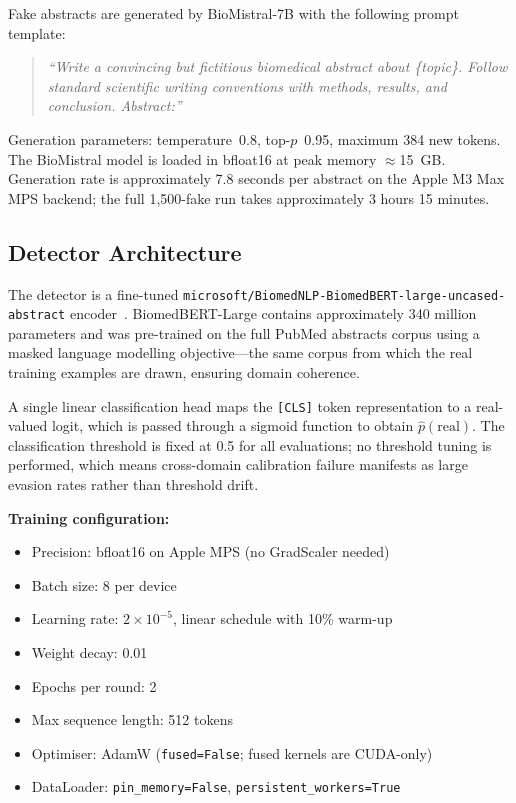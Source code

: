 \documentclass[12pt,a4paper]{article}
\begin{document}
Fake abstracts are generated by BioMistral-7B with the following prompt
template:

\begin{quote}
\textit{``Write a convincing but fictitious biomedical abstract about
\{topic\}. Follow standard scientific writing conventions with methods,
results, and conclusion. Abstract:''}
\end{quote}

Generation parameters: temperature~0.8, top-$p$~0.95, maximum 384 new
tokens. The BioMistral model is loaded in bfloat16 at peak memory
$\approx$15~GB. Generation rate is approximately 7.8 seconds per abstract
on the Apple M3 Max MPS backend; the full 1,500-fake run takes approximately
3 hours 15 minutes.

\subsection{Detector Architecture}

The detector is a fine-tuned
\texttt{microsoft/BiomedNLP-BiomedBERT-large-uncased-abstract}
encoder~\cite{gu2021biomedbert}. BiomedBERT-Large contains approximately
340 million parameters and was pre-trained on the full PubMed abstracts
corpus using a masked language modelling objective—the same corpus from
which the real training examples are drawn, ensuring domain coherence.

A single linear classification head maps the \texttt{[CLS]} token
representation to a real-valued logit, which is passed through a sigmoid
function to obtain $\hat{p}(\text{real})$. The classification threshold
is fixed at 0.5 for all evaluations; no threshold tuning is performed,
which means cross-domain calibration failure manifests as large evasion
rates rather than threshold drift.

\medskip
\noindent\textbf{Training configuration:}

\begin{itemize}[noitemsep]
    \item Precision: bfloat16 on Apple MPS (no GradScaler needed)
    \item Batch size: 8 per device
    \item Learning rate: $2\times10^{-5}$, linear schedule with 10\% warm-up
    \item Weight decay: 0.01
    \item Epochs per round: 2
    \item Max sequence length: 512 tokens
    \item Optimiser: AdamW (\texttt{fused=False}; fused kernels are CUDA-only)
    \item DataLoader: \texttt{pin\_memory=False}, \texttt{persistent\_workers=True}
\end{itemize}
\end{document}
